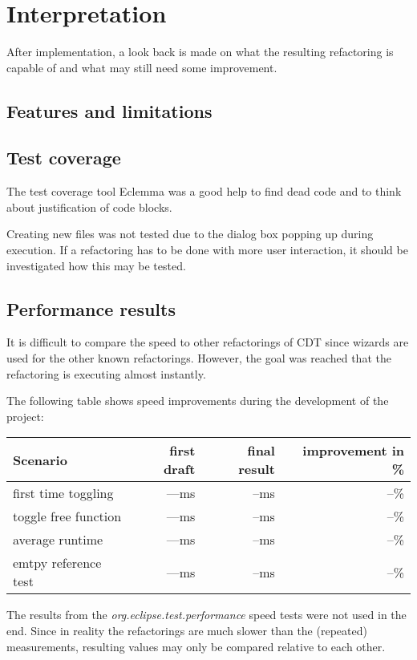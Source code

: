 \chapter{Interpretation}
\thispagestyle{fancy}

After implementation, a look back is made on what the resulting refactoring is 
capable of and what may still need some improvement.

\section{Features and limitations}


\section{Test coverage}
The test coverage tool Eclemma was a good help to find dead code and to think 
about justification of code blocks. 

Creating new files was not tested due to the dialog box popping up during 
execution. If a refactoring has to be done with more user interaction, it should 
be investigated how this may be tested.

\section{Performance results}

It is difficult to compare the speed to other refactorings of CDT since wizards 
are used for the other known refactorings. However, the goal was reached that 
the refactoring is executing almost instantly.

The following table shows speed improvements during the development of the 
project:

\begin{tabular}[t]{l|rrr}
 Scenario   & first draft & final result & improvement in \% \\
 \hline
 first time toggling 	&  ---ms & --ms & --\% \\
 toggle free function	&  ---ms & --ms & --\% \\
 average runtime	&  ---ms & --ms & --\% \\
 emtpy reference test	&  ---ms & --ms & --\% \\
\end{tabular}

The results from the \textit{org.eclipse.test.performance} speed tests were not 
used in the end. Since in reality the refactorings are much slower than the 
(repeated) measurements, resulting values may only be compared relative to each 
other.

